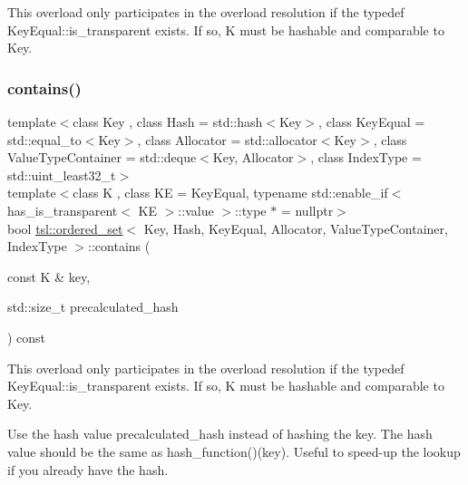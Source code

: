 This overload only participates in the overload resolution if the typedef Key\+Equal\+::is\+\_\+transparent exists. If so, K must be hashable and comparable to Key. \mbox{\label{classtsl_1_1ordered__set_a68862ad41770b6bf845c663fc119a340}} 
\subsubsection{\texorpdfstring{contains()}{contains()}\hspace{0.1cm}{\footnotesize\ttfamily [3/3]}}
{\footnotesize\ttfamily template$<$class Key , class Hash  = std\+::hash$<$\+Key$>$, class Key\+Equal  = std\+::equal\+\_\+to$<$\+Key$>$, class Allocator  = std\+::allocator$<$\+Key$>$, class Value\+Type\+Container  = std\+::deque$<$\+Key, Allocator$>$, class Index\+Type  = std\+::uint\+\_\+least32\+\_\+t$>$ \\
template$<$class K , class KE  = Key\+Equal, typename std\+::enable\+\_\+if$<$ has\+\_\+is\+\_\+transparent$<$ K\+E $>$\+::value $>$\+::type $\ast$  = nullptr$>$ \\
bool \mbox{\hyperlink{classtsl_1_1ordered__set}{tsl\+::ordered\+\_\+set}}$<$ Key, Hash, Key\+Equal, Allocator, Value\+Type\+Container, Index\+Type $>$\+::contains (\begin{DoxyParamCaption}\item[{const K \&}]{key,  }\item[{std\+::size\+\_\+t}]{precalculated\+\_\+hash }\end{DoxyParamCaption}) const\hspace{0.3cm}{\ttfamily [inline]}}





This overload only participates in the overload resolution if the typedef Key\+Equal\+::is\+\_\+transparent exists. If so, K must be hashable and comparable to Key.

Use the hash value \textquotesingle{}precalculated\+\_\+hash\textquotesingle{} instead of hashing the key. The hash value should be the same as hash\+\_\+function()(key). Useful to speed-\/up the lookup if you already have the hash. \mbox{\label{classtsl_1_1ordered__set_a6671d647ef9402361c009af2f47e29ba}} 
